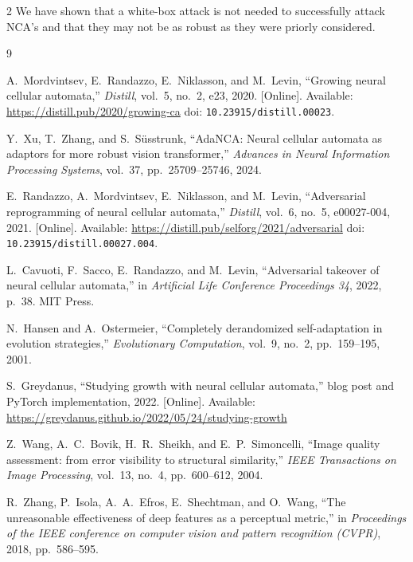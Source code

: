 \documentclass{article}
\begin{document}
\begin{multicols}{2}
We have shown that a white-box attack is not needed to successfully attack NCA's and that they may not be as robust as they were priorly considered.

\newpage

\begin{thebibliography}{9}
	
	A.~Mordvintsev, E.~Randazzo, E.~Niklasson, and M.~Levin,
	``Growing neural cellular automata,''
	\textit{Distill}, vol.~5, no.~2, e23, 2020.
	[Online]. Available: \url{https://distill.pub/2020/growing-ca}
	doi: \texttt{10.23915/distill.00023}.
	
	Y.~Xu, T.~Zhang, and S.~Süsstrunk,
	``AdaNCA: Neural cellular automata as adaptors for more robust vision transformer,''
	\textit{Advances in Neural Information Processing Systems}, vol.~37, pp.~25709--25746, 2024.
	
	E.~Randazzo, A.~Mordvintsev, E.~Niklasson, and M.~Levin,
	``Adversarial reprogramming of neural cellular automata,''
	\textit{Distill}, vol.~6, no.~5, e00027-004, 2021.
	[Online]. Available: \url{https://distill.pub/selforg/2021/adversarial}
	doi: \texttt{10.23915/distill.00027.004}.
	
	L.~Cavuoti, F.~Sacco, E.~Randazzo, and M.~Levin,
	``Adversarial takeover of neural cellular automata,''
	in \textit{Artificial Life Conference Proceedings 34}, 2022, p.~38.
	MIT Press.
	
	N.~Hansen and A.~Ostermeier,
	``Completely derandomized self-adaptation in evolution strategies,''
	\textit{Evolutionary Computation}, vol.~9, no.~2, pp.~159--195, 2001.
	
	
	S.~Greydanus,
	``Studying growth with neural cellular automata,''
	blog post and PyTorch implementation, 2022.
	[Online]. Available: \url{https://greydanus.github.io/2022/05/24/studying-growth}

    Z.~Wang, A.~C.~Bovik, H.~R.~Sheikh, and E.~P.~Simoncelli,
    ``Image quality assessment: from error visibility to structural similarity,''
    \textit{IEEE Transactions on Image Processing}, vol.~13, no.~4, pp.~600--612, 2004.
    
    R.~Zhang, P.~Isola, A.~A.~Efros, E.~Shechtman, and O.~Wang,
    ``The unreasonable effectiveness of deep features as a perceptual metric,''
    in \textit{Proceedings of the IEEE conference on computer vision and pattern recognition (CVPR)}, 2018, pp.~586--595.


\end{thebibliography}
\end{multicols}
\end{document}
